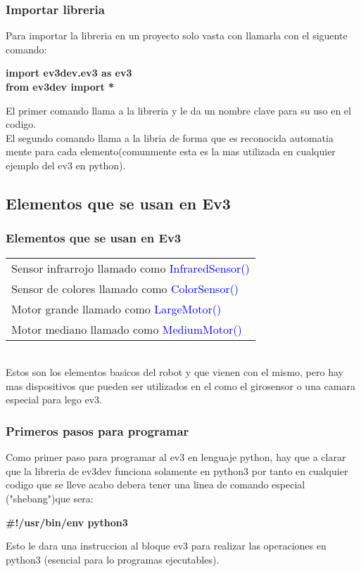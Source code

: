 \documentclass{beamer}
\begin{document}
\newpage
\begin{frame}\frametitle{Importar libreria}
Para importar la libreria en un proyecto solo vasta con llamarla con el siguente comando:

\begin{center}
\textbf{import ev3dev.ev3 as ev3\\
from ev3dev import *}
\end{center}

El primer comando llama a la libreria y le da un nombre clave para su uso en el codigo.\\
El segundo comando llama a la libria de forma que es reconocida automatia mente para cada elemento(comunmente esta es la mas utilizada en cualquier ejemplo del ev3 en python).
\end{frame}

\newpage
\subsection{Elementos que se usan en Ev3}
\begin{frame}\frametitle{Elementos que se usan en Ev3}
\begin{tabular}{l}
Sensor infrarrojo llamado como \textcolor{blue}{InfraredSensor()}\\
Sensor de colores llamado como \textcolor{blue}{ColorSensor()}\\
Motor grande llamado como \textcolor{blue}{LargeMotor()}\\ 
Motor mediano llamado como \textcolor{blue}{MediumMotor()}\\
\end{tabular}
\vspace{5mm} \\
Estos son los elementos basicos del robot y que vienen con el mismo, pero hay mas dispositivos que pueden ser utilizados en el como el girosensor o una camara especial para lego ev3.
\end{frame}

\newpage
\begin{frame}\frametitle{Primeros pasos para programar}
Como primer paso para programar al ev3 en lenguaje python, hay que a clarar que la libreria de ev3dev funciona solamente en python3 por tanto en cualquier codigo que se lleve acabo debera tener una linea de comando especial ("shebang")que sera:\\

\begin{center}
\textbf{\#!/usr/bin/env python3}
\end{center}

Esto le dara una instruccion al bloque ev3 para realizar las operaciones en python3 (esencial para lo programas ejecutables).
\end{frame}
\end{document}
